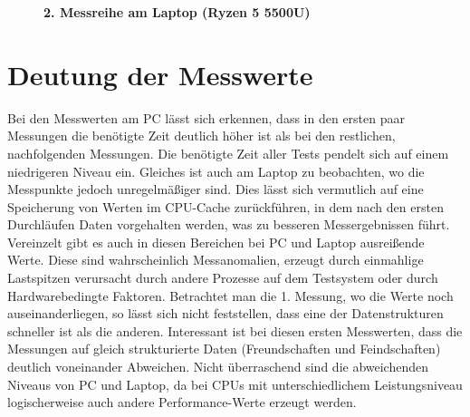 \documentclass[11pt,a4paper]{article}
\begin{document}
\begin{figure}[H]
    \centering
    \vspace*{-0.8cm}
    \caption{\textbf{2. Messreihe am Laptop (Ryzen 5 5500U)}}
\end{figure}

\section{Deutung der Messwerte}

Bei den Messwerten am PC lässt sich erkennen, dass in den ersten paar Messungen die
benötigte Zeit deutlich höher ist als bei den restlichen, nachfolgenden Messungen.
Die benötigte Zeit aller Tests pendelt sich auf einem niedrigeren Niveau ein.
Gleiches ist auch am Laptop zu beobachten, wo die Messpunkte jedoch unregelmäßiger sind.
Dies lässt sich vermutlich auf eine Speicherung von Werten im CPU-Cache zurückführen,
in dem nach den ersten Durchläufen Daten vorgehalten werden, was zu besseren
Messergebnissen führt.
Vereinzelt gibt es auch in diesen Bereichen bei PC und Laptop ausreißende Werte.
Diese sind wahrscheinlich Messanomalien, erzeugt durch einmahlige Lastspitzen verursacht
durch andere Prozesse auf dem Testsystem oder durch Hardwarebedingte Faktoren.
Betrachtet man die 1. Messung, wo die Werte noch auseinanderliegen,
so lässt sich nicht feststellen, dass eine der Datenstrukturen schneller
ist als die anderen. Interessant ist bei diesen ersten Messwerten, dass die Messungen
auf gleich strukturierte Daten (Freundschaften und Feindschaften) deutlich voneinander
Abweichen. Nicht überraschend sind die abweichenden Niveaus von PC und Laptop,
da bei CPUs mit unterschiedlichem Leistungsniveau logischerweise auch andere
Performance-Werte erzeugt werden.
\end{document}
